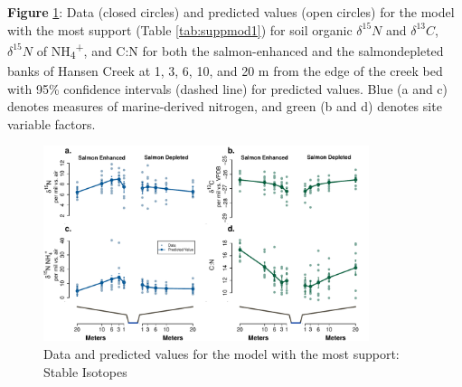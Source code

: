 \documentclass [11pt, proquest] {uwthesis}[2015/03/03]
\begin{document}
\textbf{Figure} \ref{fig:modIsotope}: Data (closed circles) and
predicted values (open circles) for the model with the most support
(Table \ref{tab:suppmod1}) for soil organic \(\delta^{15}N\) and
\(\delta^{13}C\), \(\delta^{15}N\) of
NH\textsubscript{4}\textsuperscript{+}, and C:N for both the
salmon-enhanced and the salmondepleted banks of Hansen Creek at 1, 3, 6,
10, and 20 m from the edge of the creek bed with 95\% confidence
intervals (dashed line) for predicted values. Blue (a and c) denotes
measures of marine-derived nitrogen, and green (b and d) denotes site
variable factors.\newline
\begin{figure}[h]
  \includegraphics[width=0.85\textwidth]{figure/Ch1/Figure2_Feddernetal.pdf}
  \caption{Data and predicted values for the model with the most support: Stable Isotopes}
  \label{fig:modIsotope}
\end{figure}
\clearpage
\end{document}
